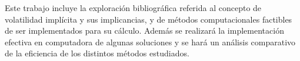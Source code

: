 \documentclass[a4paper,openright, 12pt, oneside]{book}
\begin{document}
\vspace{5mm}

Este trabajo incluye la exploración bibliográfica referida al concepto de volatilidad implícita y sus implicancias, y de métodos computacionales factibles de ser implementados para su cálculo. Además se realizará la implementación efectiva en computadora de algunas soluciones y se hará un análisis comparativo de la eficiencia de los distintos métodos estudiados.




\tableofcontents
















\end{document}
